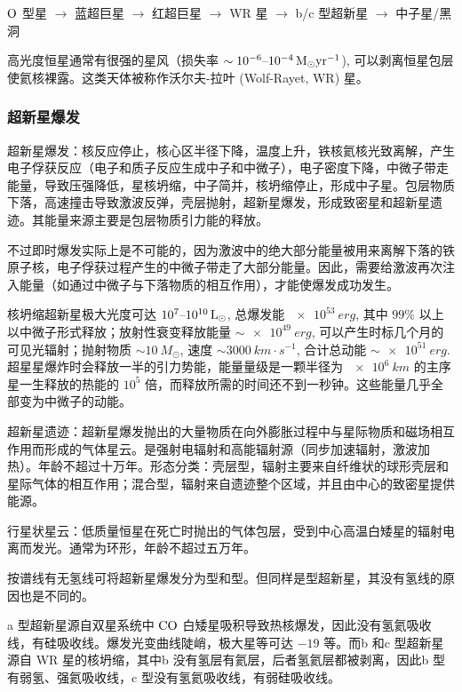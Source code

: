 \documentclass[../天体物理基础.tex]{subfiles}
\begin{document}
$\ce{O}$ 型星 $\to$ 蓝超巨星 $\to$ 红超巨星 $\to$ WR 星 $\to$ \uppercase\expandafter{}b/\uppercase\expandafter{}c 型超新星 $\to$ 中子星/黑洞

高光度恒星通常有很强的星风（损失率 $\sim10^{-6}\text{\textendash}\qty{e-4}{M_{\odot}yr^{-1}}$), 可以剥离恒星包层使氦核裸露。这类天体被称作沃尔夫{}-{}拉叶 (Wolf-Rayet, WR) 星。

\subsubsection{超新星爆发}

超新星爆发：核反应停止，核心区半径下降，温度上升，铁核氦核光致离解，产生电子俘获反应（电子和质子反应生成中子和中微子），电子密度下降，中微子带走能量，导致压强降低，星核坍缩，中子简并，核坍缩停止，形成中子星。包层物质下落，高速撞击导致激波反弹，壳层抛射，超新星爆发，形成致密星和超新星遗迹。其能量来源主要是包层物质引力能的释放。

不过即时爆发实际上是不可能的，因为激波中的绝大部分能量被用来离解下落的铁原子核，电子俘获过程产生的中微子带走了大部分能量。因此，需要给激波再次注入能量（如通过中微子与下落物质的相互作用），才能使爆发成功发生。

核坍缩超新星极大光度可达 $10^{7}\text{\textendash}\qty{e10}{L_{\odot}}$, 总爆发能 $\qty{e53}{erg}$, 其中 $99\%$ 以上以中微子形式释放；放射性衰变释放能量 $\sim\qty{e49}{erg}$, 可以产生时标几个月的可见光辐射；抛射物质 $\sim\qty{10}{M_{\odot}}$, 速度 $\sim\qty{3000}{km\cdot{}s^{-1}}$, 合计总动能 $\sim\qty{e51}{erg}$. 超星星爆炸时会释放一半的引力势能，能量量级是一颗半径为 $\qty{e6}{km}$ 的主序星一生释放的热能的 $10^{5}$ 倍，而释放所需的时间还不到一秒钟。这些能量几乎全部变为中微子的动能。

超新星遗迹：超新星爆发抛出的大量物质在向外膨胀过程中与星际物质和磁场相互作用而形成的气体星云。是强射电辐射和高能辐射源（同步加速辐射，激波加热）。年龄不超过十万年。形态分类：壳层型，辐射主要来自纤维状的球形壳层和星际气体的相互作用；混合型，辐射来自遗迹整个区域，并且由中心的致密星提供能源。

行星状星云：低质量恒星在死亡时抛出的气体包层，受到中心高温白矮星的辐射电离而发光。通常为环形，年龄不超过五万年。

按谱线有无氢线可将超新星爆发分为\uppercase\expandafter{}型和\uppercase\expandafter{}型。但同样是\uppercase\expandafter{}型超新星，其没有氢线的原因也是不同的。

\uppercase\expandafter{}a 型超新星源自双星系统中 $\ce{CO}$ 白矮星吸积导致热核爆发，因此没有氢氦吸收线，有硅吸收线。爆发光变曲线陡峭，极大星等可达 $-19$ 等。而\uppercase\expandafter{}b 和\uppercase\expandafter{}c 型超新星源自 WR 星的核坍缩，其中\uppercase\expandafter{}b 没有氢层有氦层，后者氢氦层都被剥离，因此\uppercase\expandafter{}b 型有弱氢、强氦吸收线，\uppercase\expandafter{}c 型没有氢氦吸收线，有弱硅吸收线。
\end{document}
